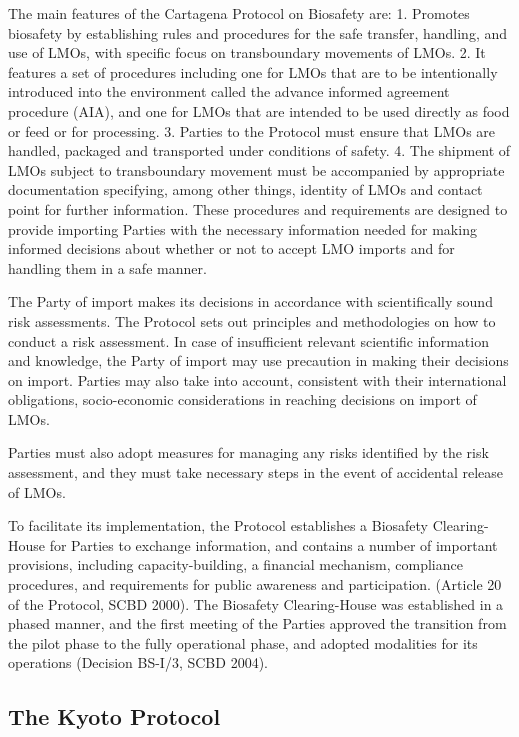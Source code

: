 \documentclass[
  openany]{book}
\begin{document}
The main features of the Cartagena Protocol on Biosafety are:
1. Promotes biosafety by establishing rules and procedures for the safe transfer, handling, and use of LMOs, with specific focus on transboundary movements of LMOs.
2. It features a set of procedures including one for LMOs that are to be intentionally introduced into the environment called the advance informed agreement procedure (AIA), and one for LMOs that are intended to be used directly as food or feed or for processing.
3. Parties to the Protocol must ensure that LMOs are handled, packaged and transported under conditions of safety.
4. The shipment of LMOs subject to transboundary movement must be accompanied by appropriate documentation specifying, among other things, identity of LMOs and contact point for further information.
These procedures and requirements are designed to provide importing Parties with the necessary information needed for making informed decisions about whether or not to accept LMO imports and for handling them in a safe manner.

The Party of import makes its decisions in accordance with scientifically sound risk assessments. The Protocol sets out principles and methodologies on how to conduct a risk assessment. In case of insufficient relevant scientific information and knowledge, the Party of import may use precaution in making their decisions on import. Parties may also take into account, consistent with their international obligations, socio-economic considerations in reaching decisions on import of LMOs.

Parties must also adopt measures for managing any risks identified by the risk assessment, and they must take necessary steps in the event of accidental release of LMOs.

To facilitate its implementation, the Protocol establishes a Biosafety Clearing-House for Parties to exchange information, and contains a number of important provisions, including capacity-building, a financial mechanism, compliance procedures, and requirements for public awareness and participation. (Article 20 of the Protocol, SCBD 2000). The Biosafety Clearing-House was established in a phased manner, and the first meeting of the Parties approved the transition from the pilot phase to the fully operational phase, and adopted modalities for its operations (Decision BS-I/3, SCBD 2004).

\hypertarget{the-kyoto-protocol}{%
\subsection{The Kyoto Protocol}\label{the-kyoto-protocol}}
\end{document}
